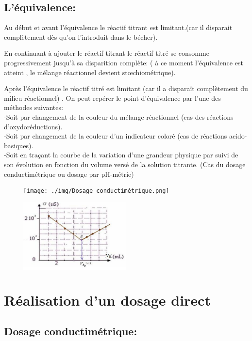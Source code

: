 \documentclass[12pt]{article}
\begin{document}
  \subsection{L'équivalence:}
Au début et avant l'équivalence le réactif titrant est limitant.(car il disparait complètement dès qu'on l'introduit dans le
bécher).

  En continuant à ajouter le réactif titrant le réactif titré se consomme progressivement jusqu'à sa disparition complète:
( à ce moment l'équivalence est atteint , le mélange réactionnel devient stœchiométrique).

  Après l'équivalence le réactif titré est limitant (car il a disparaît complètement du milieu réactionnel) .
On peut repérer le point d'équivalence par l'une des méthodes suivantes:
\\-Soit par changement de la couleur du mélange réactionnel (cas des réactions d'oxydoréductions).
\\-Soit par changement de la couleur d'un indicateur coloré (cas de réactions acido-basiques).
\\-Soit en traçant la courbe de la variation d'une grandeur physique par suivi de son évolution en fonction du volume
versé de la solution titrante. (Cas du dosage conductimétrique ou dosage par pH-métrie)
  \begin{figure}
    \vspace{-0.6cm}
    \texttt{[image: ./img/Dosage conductimétrique.png]}
\end{figure}
  
  \begin{figure}
\vspace{-1.8cm}
    \includegraphics[width=0.5\textwidth]{./img/courbe dosage conduc.png}
\end{figure}
  \section{Réalisation d’un dosage direct}
  \subsection{Dosage conductimétrique:}
\end{document}
